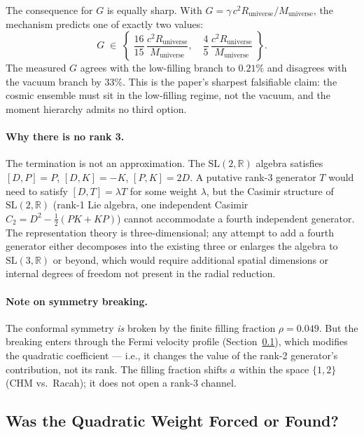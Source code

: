 \documentclass[11pt,letterpaper]{article}
\newcommand{\Runiv}{R_{\mathrm{universe}}}
\newcommand{\Muniv}{M_{\mathrm{universe}}}
\begin{document}
The consequence for $G$ is equally sharp. With $G = \gamma\,c^2\Runiv/\Muniv$,
the mechanism predicts one of exactly two values:
\begin{equation}
  G \;\in\; \left\{\;
    \frac{16}{15}\,\frac{c^2\Runiv}{\Muniv},\quad
    \frac{4}{5}\,\frac{c^2\Runiv}{\Muniv}
  \;\right\}.
  \label{eq:G_dichotomy}
\end{equation}
The measured $G$ agrees with the low-filling branch to $0.21\%$ and
disagrees with the vacuum branch by $33\%$. This is the paper's
sharpest falsifiable claim: the cosmic ensemble must sit in the
low-filling regime, not the vacuum, and the moment hierarchy admits
no third option.

\paragraph{Why there is no rank 3.}
The termination is not an approximation. The $\mathrm{SL}(2,\mathbb{R})$
algebra satisfies $[D, P] = P$, $[D, K] = -K$, $[P, K] = 2D$.
A putative rank-3 generator $T$ would need to satisfy
$[D, T] = \lambda T$ for some weight $\lambda$, but the Casimir structure
of $\mathrm{SL}(2,\mathbb{R})$ (rank-1 Lie algebra, one independent
Casimir $C_2 = D^2 - \tfrac{1}{2}(PK + KP)$) cannot accommodate
a fourth independent generator. The representation theory is three-dimensional;
any attempt to add a fourth generator either decomposes into the existing
three or enlarges the algebra to $\mathrm{SL}(3,\mathbb{R})$ or beyond, which
would require additional spatial dimensions or internal degrees of freedom
not present in the radial reduction.

\paragraph{Note on symmetry breaking.} The conformal symmetry \emph{is}
broken by the finite filling fraction $\rho = 0.049$. But the breaking enters
through the Fermi velocity profile (Section~\ref{sec:weight_forced}), which
modifies the quadratic coefficient --- i.e., it changes the value of the
rank-2 generator's contribution, not its rank. The filling fraction shifts $a$
within the space $\{1, 2\}$ (CHM vs.\ Racah); it does not open a rank-3
channel.

\subsection{Was the Quadratic Weight Forced or Found?}
\label{sec:weight_forced}
\end{document}

